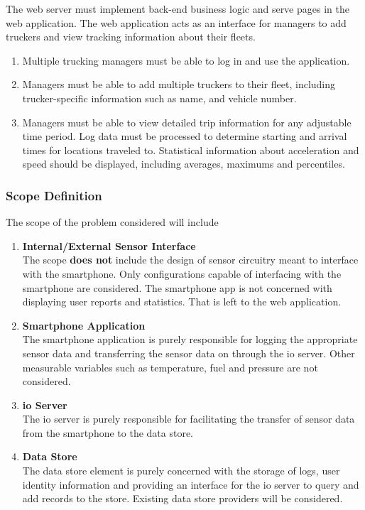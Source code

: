 \begin{enumerate}
The web server must implement back-end business logic and serve pages in the web application.
The web application acts as an interface for managers to add truckers and view tracking information about their fleets.
    \begin{enumerate}
        \item Multiple trucking managers must be able to log in and use the application.
        \item Managers must be able to add multiple truckers to their fleet, including trucker-specific information such as name, and vehicle number.
        \item Managers must be able to view detailed trip information for any adjustable time period. Log data must be processed to determine starting and arrival times for locations traveled to. Statistical information about acceleration and speed should be displayed, including averages, maximums and percentiles.
    \end{enumerate}
\end{enumerate}
\subsubsection{Scope Definition}
The scope of the problem considered will include
\begin{enumerate}
\item \textbf{Internal/External Sensor Interface}\\
The scope \textbf{does not} include the design of sensor circuitry meant to interface with the smartphone. Only configurations capable of interfacing with the smartphone are considered.
The smartphone app is not concerned with displaying user reports and statistics. That is left to the web application.
\item \textbf{Smartphone Application}\\
The smartphone application is purely responsible for logging the appropriate sensor data and transferring the sensor data on through the \ac{io} server.
Other measurable variables such as temperature, fuel and pressure are not considered.
\item \textbf{\ac{io} Server}\\
The \ac{io} server is purely responsible for facilitating the transfer of sensor data from the smartphone to the data store.
\item \textbf{Data Store}\\
    The data store element is purely concerned with the storage of logs, user identity information and providing an interface for the \ac{io} server to query and add records to the store.
    Existing data store providers will be considered.
\end{enumerate}

